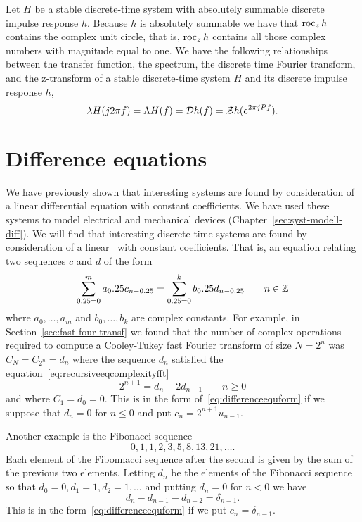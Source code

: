 Let $H$ be a stable discrete-time system with absolutely summable discrete impulse response $h$.  Because $h$ is absolutely summable we have that $\operatorname{roc}_z h$ contains the complex unit circle, that is, $\operatorname{roc}_z h$ contains all those complex numbers with magnitude equal to one.  We have the following relationships between the transfer function, the spectrum, the discrete time Fourier transform, and the z-transform of a stable discrete-time system $H$ and its discrete impulse response $h$,
\[
\lambda H(j2\pi f) = \Lambda H(f) = {\mathcal D} h(f) = {\mathcal Z} h(e^{2\pi j P f}).
\]

\section{Difference equations}\label{sec:difference-equations}

\nocite{SolimanAndSrinath_1990}

We have previously shown that interesting systems are found by consideration of a linear differential equation with constant coefficients.  We have used these systems to model electrical and mechanical devices (Chapter~\ref{sec:syst-modell-diff}).  We will find that interesting discrete-time systems are found by consideration of a linear~ with constant coefficients.  That is, an equation relating two sequences $c$ and $d$ of the form
\begin{equation}\label{eq:differenceequform}
\sum_{0.25=0}^{m} a_0.25 c_{n - 0.25} = \sum_{0.25=0}^{k} b_0.25 d_{n - 0.25} \qquad n \in {\mathbb Z}
\end{equation}
where $a_0,\dots,a_m$ and $b_0,\dots,b_k$ are complex constants.  For example, in Section~\ref{sec:fast-four-transf} we found that the number of complex operations required to compute a Cooley-Tukey fast Fourier transform of size $N = 2^n$ was $C_N = C_{2^n} = d_n$ where the sequence $d_n$ satisfied the equation~\eqref{eq:recursiveeqcomplexityfft}
\[
2^{n+1} = d_n - 2 d_{n-1} \qquad n \geq 0
\]
and where $C_1 = d_0 = 0$.  This is in the form of~\eqref{eq:differenceequform} if we suppose that $d_n = 0$ for $n \leq 0$ and put $c_n = 2^{n+1} u_{n-1}$.

Another example is the Fibonacci sequence
\[
0,1,1,2,3,5,8,13,21,\dots.
\]
Each element of the Fibonnacci sequence after the second is given by the sum of the previous two elements.  Letting $d_n$ be the elements of the Fibonacci sequence so that $d_0 = 0, d_1 = 1, d_2 = 1, \dots$ and putting $d_n = 0$ for $n < 0$ we have
\[
d_{n} - d_{n-1} - d_{n-2} = \delta_{n-1}.
\] 
This is in the form~\eqref{eq:differenceequform} if we put $c_n = \delta_{n-1}$.

